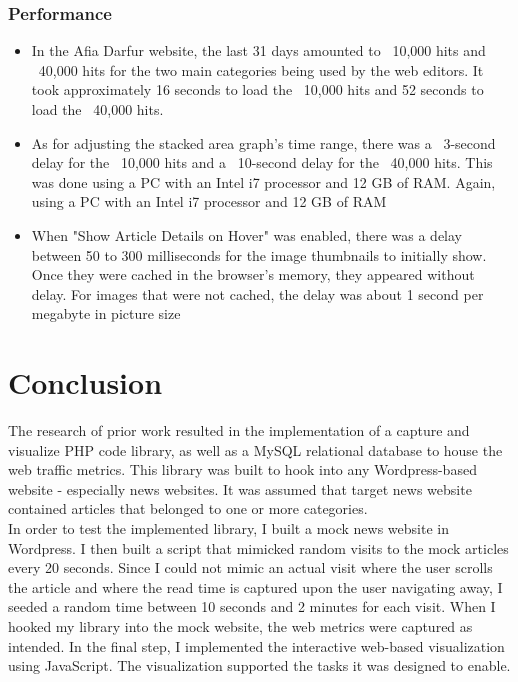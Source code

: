 \documentclass[12pt]{article}
\begin{document}
\subsubsection{Performance}
\begin{itemize}
\item In the Afia Darfur website, the last 31 days amounted to ~10,000 hits and ~40,000 hits for the two main categories being used by the web editors. It took approximately 16 seconds to load the ~10,000 hits and 52 seconds to load the ~40,000 hits. 
\item As for adjusting the stacked area graph's time range, there was a ~3-second delay for the ~10,000 hits and a ~10-second delay for the ~40,000 hits. This was done using a PC with an Intel i7 processor and 12 GB of RAM. Again, using a PC with an Intel i7 processor and 12 GB of RAM
\item When "Show Article Details on Hover" was enabled, there was a delay between 50 to 300 milliseconds for the image thumbnails to initially show. Once they were cached in the browser's memory, they appeared without delay. For images that were not cached, the delay was about 1 second per megabyte in picture size
\end{itemize}

\newpage

\section{Conclusion}
The research of prior work resulted in the implementation of a capture and visualize PHP code library, as well as a MySQL relational database to house the web traffic metrics. This library was built to hook into any Wordpress-based website - especially news websites. It was assumed that target news website contained articles that belonged to one or more categories.  \\    

In order to test the implemented library, I built a mock news website in Wordpress. I then built a script that mimicked random visits to the mock articles every 20 seconds. Since I could not mimic an actual visit where the user scrolls the article and where the read time is captured upon the user navigating away, I seeded a random time between 10 seconds and 2 minutes for each visit. When I hooked my library into the mock website, the web metrics were captured as intended. 
In the final step, I implemented the interactive web-based visualization using JavaScript. The visualization supported the tasks it was designed to enable. 
\end{document}
